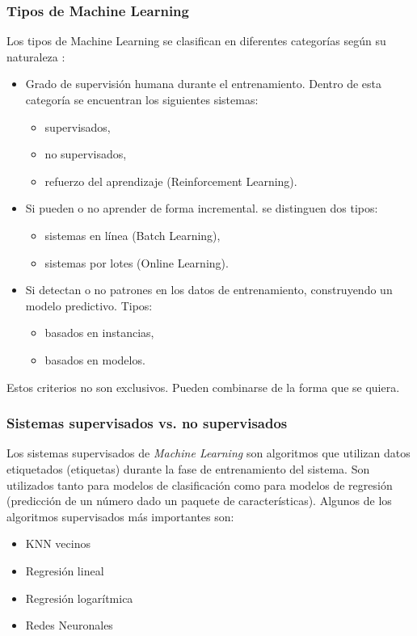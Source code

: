 \documentclass[12pt,a4paper,Spanish]{article}
\begin{document}
\subsubsection{Tipos de Machine Learning}
Los tipos de Machine Learning se clasifican en diferentes categorías según su naturaleza \cite{geron2022hands}:
\begin{itemize}
	\item Grado de supervisión humana durante el entrenamiento. Dentro de esta categoría se encuentran los siguientes sistemas:
	\begin{itemize}
		\item supervisados,
		\item no supervisados,
		\item refuerzo del aprendizaje (Reinforcement Learning).
	\end{itemize}
	\item Si pueden o no aprender de forma incremental. se distinguen dos tipos:
	\begin{itemize}
		\item sistemas en línea (Batch Learning),
		\item sistemas por lotes (Online Learning).
	\end{itemize}
	\item Si detectan o no patrones en los datos de entrenamiento, construyendo un modelo predictivo. Tipos:
	\begin{itemize}
		\item basados en instancias,
		\item basados en modelos.
	\end{itemize}
\end{itemize}

Estos criterios no son exclusivos. Pueden combinarse de la forma que se quiera.

\subsubsection{Sistemas supervisados vs. no supervisados}
Los sistemas supervisados de \textit{Machine Learning} son algoritmos que utilizan datos etiquetados (etiquetas) durante la fase de entrenamiento del sistema. Son utilizados tanto para modelos de clasificación como para modelos de regresión (predicción de un número dado un paquete de características). Algunos de los algoritmos supervisados más importantes son:
\begin{itemize}
	\item KNN vecinos
	\item Regresión lineal
	\item Regresión logarítmica
	\item Redes Neuronales	
\end{itemize}
\end{document}

